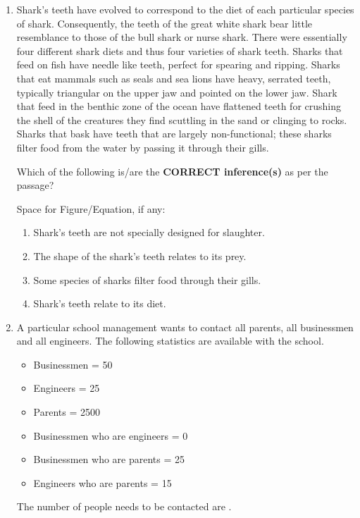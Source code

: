 \documentclass[journal,12pt,onecolumn]{exam}
\theoremstyle{remark}
\begin{document}
\begin{enumerate}
\begin{enumerate}
    
\end{enumerate}
\newpage

 \item Shark's teeth have evolved to correspond to the diet of each particular species of shark. Consequently, the teeth of the great white shark bear little resemblance to those of the bull shark or nurse shark. There were essentially four different shark diets and thus four varieties of shark teeth. Sharks that feed on fish have needle like teeth, perfect for spearing and ripping. Sharks that eat mammals such as seals and sea lions have heavy, serrated teeth, typically triangular on the upper jaw and pointed on the lower jaw. Shark that feed in the benthic zone of the ocean have flattened teeth for crushing the shell of the creatures they find scuttling in the sand or clinging to rocks. Sharks that bask have teeth that are largely non-functional; these sharks filter food from the water by passing it through their gills.

Which of the following is/are the \textbf{CORRECT inference(s)} as per the passage?

\vspace{0.2cm}
Space for Figure/Equation, if any:
\begin{enumerate}
  \item Shark's teeth are not specially designed for slaughter.
  \item The shape of the shark's teeth relates to its prey.
  \item Some species of sharks filter food through their gills.
  \item Shark's teeth relate to its diet.
\end{enumerate}
\item A particular school management wants to contact all parents, all businessmen and all engineers. The following statistics are available with the school.

\begin{itemize}
  \item Businessmen = 50
  \item Engineers = 25
  \item Parents = 2500
  \item Businessmen who are engineers = 0
  \item Businessmen who are parents = 25
  \item Engineers who are parents = 15
\end{itemize}

The number of people needs to be contacted are \underline{\hspace{2cm}}.


\end{enumerate}
\end{document}
